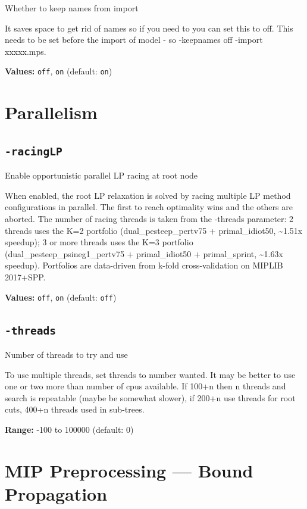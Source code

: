 \documentclass[11pt,a4paper]{article}
\begin{document}
Whether to keep names from import

It saves space to get rid of names so if you need to you can set this to off. This needs to be set before the import of model - so -keepnames off -import xxxxx.mps.

\textbf{Values:} \texttt{off}, \texttt{on} (default: \texttt{on})

\section{Parallelism}

\subsection*{\texttt{-racingLP}}

Enable opportunistic parallel LP racing at root node

When enabled, the root LP relaxation is solved by racing multiple LP method configurations in parallel. The first to reach optimality wins and the others are aborted. The number of racing threads is taken from the -threads parameter: 2 threads uses the K=2 portfolio (dual\_pesteep\_pertv75 + primal\_idiot50, \textasciitilde{}1.51x speedup); 3 or more threads uses the K=3 portfolio (dual\_pesteep\_psineg1\_pertv75 + primal\_idiot50 + primal\_sprint, \textasciitilde{}1.63x speedup). Portfolios are data-driven from k-fold cross-validation on MIPLIB 2017+SPP.

\textbf{Values:} \texttt{off}, \texttt{on} (default: \texttt{off})

\subsection*{\texttt{-threads}}

Number of threads to try and use

To use multiple threads, set threads to number wanted.  It may be better to use one or two more than number of cpus available.  If 100+n then n threads and search is repeatable (maybe be somewhat slower), if 200+n use threads for root cuts, 400+n threads used in sub-trees.

\textbf{Range:} -100 to 100000 (default: 0)

\section{MIP Preprocessing --- Bound Propagation}
\end{document}
